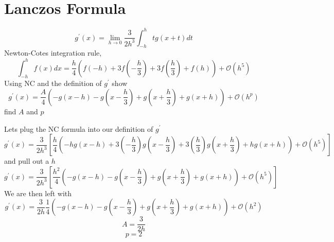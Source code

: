 \documentclass{article}
\begin{document}
\section{Lanczos Formula}
\[
    g^{\prime}(x) = \lim_{h \rightarrow 0} \frac{3}{2h^3}
    \int_{-h}^{h} t g(x+t) dt
\]
Newton-Cotes integration rule, 
\[
    \int_{-h}^{h} f(x)dx = 
    \frac{h}{4} \left(
            f(-h) + 3f\left(-\frac{h}{3}\right) + 3f\left(\frac{h}{3}\right) + f(h)
\right)
    + \mathcal{O}(h^5)
\]
Using NC and the definition of $g^{\prime}$ show 
\[
        g^{\prime}(x) =  \frac{A}{4} \left(
            -g(x-h) 
            -g\left(x-\frac{h}{3}\right) +
            g\left(x+\frac{h}{3}\right) +
            g(x+h)
\right)
    + \mathcal{O}(h^p)
\]
find $A$ and $p$

Lets plug the NC formula into our definition of $g^{\prime}$
\[
        g^{\prime}(x) =  \frac{3}{2h^3}\left[
    \frac{h}{4} \left(
            -hg(x-h) + 
            3\left(-\frac{h}{3}\right)g\left(x-\frac{h}{3}\right) +
            3\left(\frac{h}{3}\right)g\left(x+\frac{h}{3}\right) +
            hg(x+h)
\right)
    + \mathcal{O}(h^5)
    \right]
\]
and pull out a $h$
\[
        g^{\prime}(x) =  \frac{3}{2h^3}\left[
    \frac{h^2}{4} \left(
            -g(x-h)
            -g\left(x-\frac{h}{3}\right) +
            g\left(x+\frac{h}{3}\right) +
            g(x+h)
\right)
    + \mathcal{O}(h^5)
    \right]
\]
We are then left with 
\[
        g^{\prime}(x) =  \frac{3}{2h}\frac{1}{4} \left(
            -g(x-h) 
            -g\left(x-\frac{h}{3}\right) +
            g\left(x+\frac{h}{3}\right) +
            g(x+h)
\right)
    + \mathcal{O}(h^2)
\]
\[
        A =\frac{3}{2h} 
\]
\[
        p = 2
\]
\end{document}
